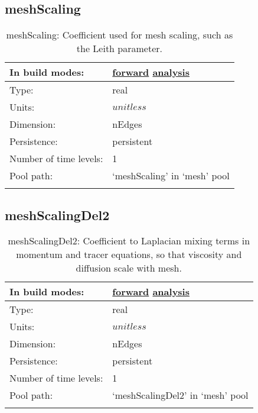 \subsection[meshScaling]{meshScaling}
\label{subsec:var_sec_mesh_meshScaling}
\begin{center}
\begin{longtable}{| p{2.0in} | p{4.0in} |}
        \hline 
        In build modes: & \hyperref[subsec:forward_var_tab_mesh]{forward} \hyperref[subsec:analysis_var_tab_mesh]{analysis} \\
        \hline 
        Type: & real \\
        \hline 
        Units: & $unitless$ \\
        \hline 
        Dimension: & nEdges \\
        \hline 
        Persistence: & persistent \\
        \hline 
        Number of time levels: & 1 \\
        \hline 
            Pool path: & `meshScaling' in `mesh' pool \\
		 \hline 
    \caption{meshScaling: Coefficient used for mesh scaling, such as the Leith parameter.}
\end{longtable}
\end{center}
\subsection[meshScalingDel2]{meshScalingDel2}
\label{subsec:var_sec_mesh_meshScalingDel2}
\begin{center}
\begin{longtable}{| p{2.0in} | p{4.0in} |}
        \hline 
        In build modes: & \hyperref[subsec:forward_var_tab_mesh]{forward} \hyperref[subsec:analysis_var_tab_mesh]{analysis} \\
        \hline 
        Type: & real \\
        \hline 
        Units: & $unitless$ \\
        \hline 
        Dimension: & nEdges \\
        \hline 
        Persistence: & persistent \\
        \hline 
        Number of time levels: & 1 \\
        \hline 
            Pool path: & `meshScalingDel2' in `mesh' pool \\
		 \hline 
    \caption{meshScalingDel2: Coefficient to Laplacian mixing terms in momentum and tracer equations, so that viscosity and diffusion scale with mesh.}
\end{longtable}
\end{center}
